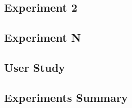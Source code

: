 
\subsection{Experiment 2}
\label{subsec:Exp2}


\subsection{Experiment N}
\label{subsec:ExpN}

\subsection{User Study}
\label{subsec:user}



\subsection{Experiments Summary}
\label{subsec:Exp:Summary}
